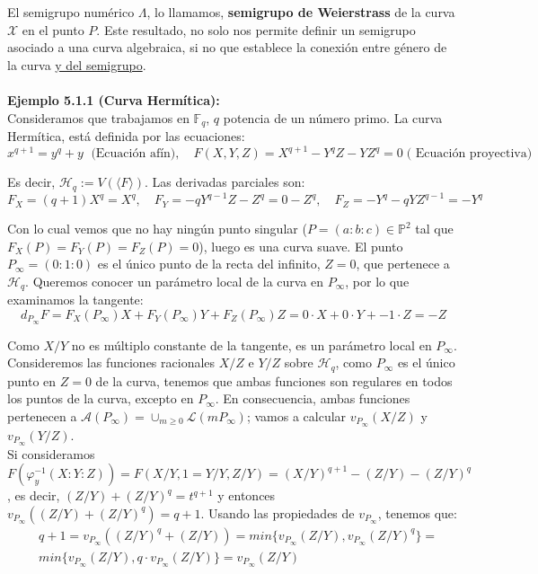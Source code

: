 \documentclass[11pt,spanish]{book}
\begin{document}
El semigrupo numérico $\Lambda$, lo llamamos, \textbf{semigrupo de Weierstrass} de la curva $\mathbf{\mathcal{X}}$ en el punto $P$. Este resultado, no solo nos permite definir un semigrupo asociado a una curva algebraica, si no que establece la conexión entre género de la curva \hyperlink{def1.7}{y del semigrupo}.\\
\\ \textbf{Ejemplo 5.1.1 (Curva Hermítica): }\\

Consideramos que trabajamos en $\mathbb{F}_q$, $q$ potencia de un número primo. La curva Hermítica, está definida por las ecuaciones:
$$ x^{q+1} = y^{q} + y\; \text{ (Ecuación afín)}, \quad F(X,Y,Z)=X^{q+1}-Y^{q}Z-YZ^{q} = 0\; \text{( Ecuación proyectiva)} $$

Es decir, $\mathcal{H}_q:=V(\langle F\rangle)$. Las derivadas parciales son:
$$F_{X}=(q+1)X^{q}=X^{q},\quad F_{Y}=-qY^{q-1}Z-Z^{q}=0-Z^{q},\quad F_{Z}=-Y^{q}-qYZ^{q-1}=-Y^{q}$$

Con lo cual vemos que no hay ningún punto singular ($P=(a:b:c)\in\mathbb{P}^2$ tal que $F_X(P)=F_Y(P)=F_Z(P)=0$), luego es una curva suave. El punto $P_{\infty}=(0:1:0)$ es el único punto de la recta del infinito, $Z=0$, que pertenece a $\mathcal{H}_q$. Queremos conocer un parámetro local de la curva en $P_{\infty}$, por lo que examinamos la tangente:
$$d_{P_\infty}F=F_{X}(P_\infty)X+F_Y(P_\infty)Y+F_Z(P_\infty)Z=0\cdot X + 0\cdot Y + -1\cdot Z = -Z$$

Como $X/Y$ no es múltiplo constante de la tangente, es un parámetro local en $P_\infty$.\\
Consideremos las funciones racionales $X/Z$ e $Y/Z$ sobre $\mathcal{H}_q$, como $P_\infty$ es el único punto en $Z=0$ de la curva, tenemos que ambas funciones son regulares en todos los puntos de la curva, excepto en $P_\infty$. En consecuencia, ambas funciones pertenecen a $\mathcal{A}(P_\infty)=\cup_{m\geq 0} \mathcal{L}(mP_\infty)$; vamos a calcular $v_{P_\infty}(X/Z)$ y $v_{P_\infty}(Y/Z)$.\\

Si consideramos $F(\varphi^{-1}_{y}(X:Y:Z))=F(X/Y,1=Y/Y,Z/Y)=(X/Y)^{q+1}-(Z/Y)-(Z/Y)^{q}$, es decir, $(Z/Y)+(Z/Y)^{q}=t^{q+1}$ y entonces $v_{P_\infty}((Z/Y)+(Z/Y)^{q})=q+1$. Usando las propiedades de $v_{P_\infty}$, tenemos que:
\begin{align*}
 &q+1=v_{P_\infty}((Z/Y)^{q}+(Z/Y))= min\{v_{P_\infty}(Z/Y),v_{P_\infty}(Z/Y)^{q}\}=\\ &min\{v_{P_\infty}(Z/Y),q\cdot v_{P_\infty}(Z/Y)\}=v_{P_\infty}(Z/Y)
\end{align*}
\end{document}
